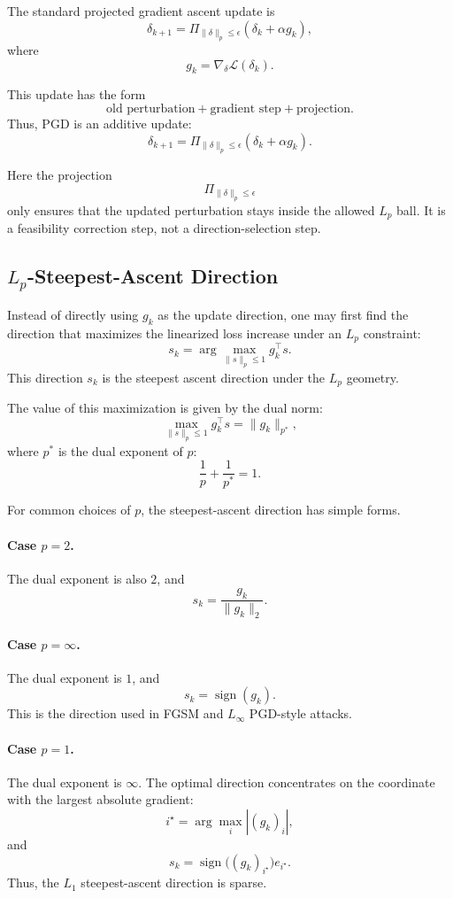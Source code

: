 \documentclass{article}
\begin{document}
The standard projected gradient ascent update is
\[
\delta_{k+1}
=
\Pi_{\|\delta\|_p\le \epsilon}
\left(
\delta_k+\alpha g_k
\right),
\]
where
\[
g_k=\nabla_\delta \mathcal{L}(\delta_k).
\]

This update has the form
\[
\text{old perturbation}
+
\text{gradient step}
+
\text{projection}.
\]
Thus, PGD is an additive update:
\[
\delta_{k+1}
=
\Pi_{\|\delta\|_p\le \epsilon}
\left(
\delta_k+\alpha g_k
\right).
\]

Here the projection
\[
\Pi_{\|\delta\|_p\le \epsilon}
\]
only ensures that the updated perturbation stays inside the allowed $L_p$ ball. It is a feasibility correction step, not a direction-selection step.

\subsection{$L_p$-Steepest-Ascent Direction}

Instead of directly using $g_k$ as the update direction, one may first find the direction that maximizes the linearized loss increase under an $L_p$ constraint:
\[
s_k
=
\arg\max_{\|s\|_p\le 1}
g_k^\top s.
\]
This direction $s_k$ is the steepest ascent direction under the $L_p$ geometry.

The value of this maximization is given by the dual norm:
\[
\max_{\|s\|_p\le 1} g_k^\top s
=
\|g_k\|_{p^\ast},
\]
where $p^\ast$ is the dual exponent of $p$:
\[
\frac{1}{p}+\frac{1}{p^\ast}=1.
\]

For common choices of $p$, the steepest-ascent direction has simple forms.

\paragraph{Case $p=2$.}
The dual exponent is also $2$, and
\[
s_k
=
\frac{g_k}{\|g_k\|_2}.
\]

\paragraph{Case $p=\infty$.}
The dual exponent is $1$, and
\[
s_k
=
\operatorname{sign}(g_k).
\]
This is the direction used in FGSM and $L_\infty$ PGD-style attacks.

\paragraph{Case $p=1$.}
The dual exponent is $\infty$. The optimal direction concentrates on the coordinate with the largest absolute gradient:
\[
i^\star=\arg\max_i |(g_k)_i|,
\]
and
\[
s_k
=
\operatorname{sign}\bigl((g_k)_{i^\star}\bigr)e_{i^\star}.
\]
Thus, the $L_1$ steepest-ascent direction is sparse.
\end{document}
